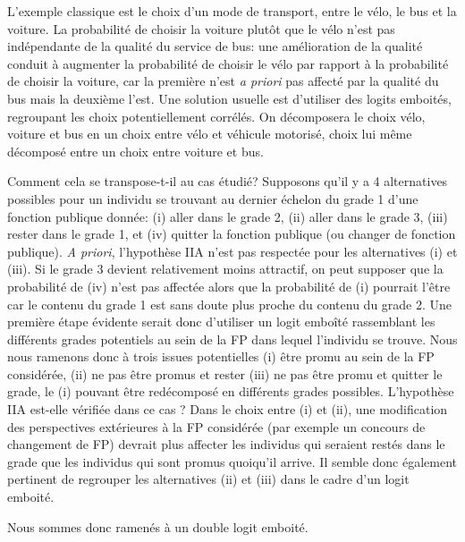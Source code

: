 \documentclass[11pt,a4paper]{article}
\begin{document}
L'exemple classique est le choix d'un mode de transport, entre le vélo, le bus et la voiture. La probabilité de choisir la voiture plutôt que le vélo n'est pas indépendante de la qualité du service de bus: une amélioration de la qualité conduit à augmenter la probabilité de choisir le vélo par rapport à la probabilité de choisir la voiture, car la première n'est \textit{a priori} pas affecté par la qualité du bus mais la deuxième l'est. Une solution usuelle est d'utiliser des logits emboités, regroupant les choix potentiellement corrélés. On décomposera le choix vélo, voiture et bus en un choix entre vélo et véhicule motorisé, choix lui même décomposé entre un choix entre voiture et bus. 


Comment cela se transpose-t-il au cas étudié? Supposons qu'il y a 4 alternatives possibles pour un individu se trouvant au dernier échelon du grade 1 d'une fonction publique donnée: (i) aller dans le grade 2, (ii) aller dans le grade 3, (iii) rester dans le grade 1, et (iv) quitter la fonction publique (ou changer de fonction publique). \textit{A priori}, l'hypothèse IIA n'est pas respectée pour les alternatives (i) et (iii). Si le grade 3 devient relativement moins attractif, on peut supposer que la probabilité de (iv) n'est pas affectée alors que la probabilité de (i) pourrait l'être car le contenu du grade 1 est sans doute plus proche du contenu du grade 2. Une première étape évidente serait donc d'utiliser un logit emboîté rassemblant les différents  grades potentiels au sein de la FP dans lequel l'individu se trouve. Nous nous ramenons donc à trois issues potentielles (i) être promu au sein de la FP considérée, (ii) ne pas être promus et rester (iii) ne pas être promu et quitter le grade, le (i) pouvant être redécomposé en différents grades possibles. 
L'hypothèse IIA est-elle vérifiée dans ce cas ? Dans le choix entre (i) et (ii), une modification des perspectives extérieures à la FP considérée (par exemple un concours de changement de FP) devrait plus affecter les individus qui seraient restés dans le grade que les individus qui sont promus quoiqu'il arrive. Il semble donc également pertinent de regrouper les alternatives (ii) et (iii) dans le cadre d'un logit emboité. 

Nous sommes donc ramenés à un double logit emboité. 
\end{document}
